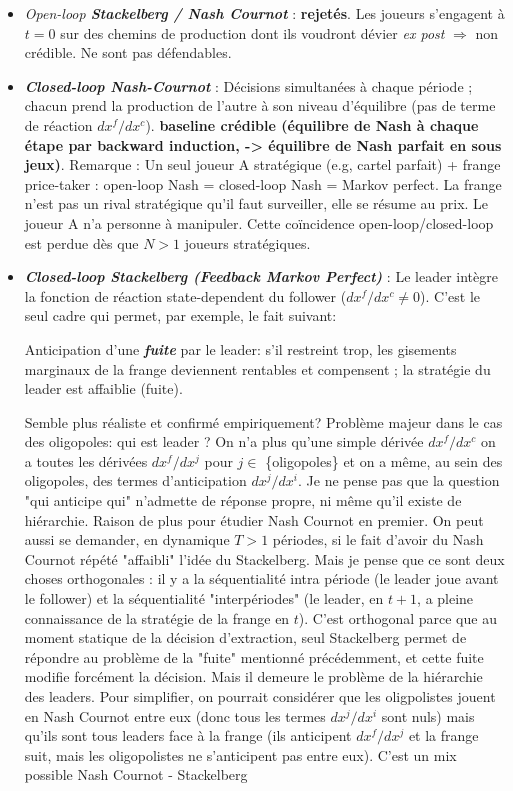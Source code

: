 \documentclass[11pt]{article}
\begin{document}
\begin{itemize}
    \item \emph{Open-loop \textbf{Stackelberg / Nash Cournot}} : \textbf{rejetés}. Les joueurs s'engagent à $t=0$ sur des chemins de production dont ils voudront dévier \emph{ex post} $\Rightarrow$ non crédible. Ne sont pas défendables. 
    \item \emph{\textbf{Closed-loop Nash-Cournot}} : Décisions simultanées à chaque période ;  chacun prend la production de l'autre à son niveau d'équilibre (pas de terme de réaction $dx^f/dx^c$). \textbf{baseline crédible (équilibre de Nash à chaque étape par backward induction, -> équilibre de Nash parfait en sous jeux)}. Remarque : Un seul joueur A stratégique (e.g, cartel parfait) + frange price-taker : open-loop Nash = closed-loop Nash = Markov perfect. La frange n'est pas un rival stratégique qu'il faut surveiller, elle se résume au prix. Le joueur A n'a personne à manipuler. Cette co\"incidence open-loop/closed-loop est perdue dès que $N>1$ joueurs stratégiques.
    \item \emph{\textbf{Closed-loop Stackelberg (Feedback Markov Perfect)}} : Le leader intègre la fonction de réaction state-dependent du follower ($dx^f/dx^c\neq0$). C'est le seul cadre qui permet, par exemple, le fait suivant:  
    
    Anticipation d'une \textbf{\textit{fuite}} par le leader: s'il restreint trop, les gisements marginaux de la frange deviennent rentables et compensent ; la  stratégie du leader est affaiblie (fuite). 
    
    Semble plus réaliste et confirmé empiriquement? Problème majeur dans le cas des oligopoles: qui est leader ? On n'a plus qu'une simple dérivée $dx^f/dx^c$ on a toutes les dérivées $dx^f/dx^j$ pour $j \in$ \{oligopoles\} et on a même, au sein des oligopoles, des termes d'anticipation $dx^j/dx^i$. Je ne pense pas que la question "qui anticipe qui" n'admette de réponse propre, ni même qu'il existe de hiérarchie. Raison de plus pour étudier Nash Cournot en premier. On peut aussi se demander, en dynamique $T>1$ périodes, si le fait d'avoir du Nash Cournot répété "affaibli" l'idée du Stackelberg. Mais je pense que ce sont deux choses orthogonales : il y a la séquentialité intra période (le leader joue avant le follower) et la séquentialité "interpériodes" (le leader, en $t+1$, a pleine connaissance de la stratégie de la frange en $t$). C'est orthogonal parce que au moment statique de la décision d'extraction, seul Stackelberg permet de répondre au problème de la "fuite" mentionné précédemment, et cette fuite modifie forcément la décision. Mais il demeure le problème de la hiérarchie des leaders. Pour simplifier, on pourrait considérer que les oligpolistes jouent en Nash Cournot entre eux (donc tous les termes $dx^j/dx^i$ sont nuls) mais qu'ils sont tous leaders face à la frange (ils anticipent $dx^f/dx^j$ et la frange suit, mais les oligopolistes ne s'anticipent pas entre eux). C'est un mix possible Nash Cournot - Stackelberg


\end{itemize}
\end{document}
